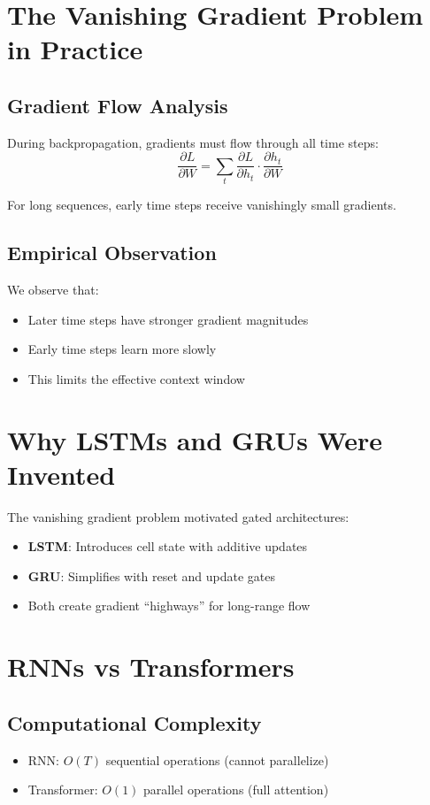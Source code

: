 \documentclass[12pt]{article}
\begin{document}
\section{The Vanishing Gradient Problem in Practice}

\subsection{Gradient Flow Analysis}
During backpropagation, gradients must flow through all time steps:
\begin{equation}
    \frac{\partial L}{\partial W} = \sum_t \frac{\partial L}{\partial h_t} \cdot \frac{\partial h_t}{\partial W}
\end{equation}

For long sequences, early time steps receive vanishingly small gradients.

\subsection{Empirical Observation}
We observe that:
\begin{itemize}
    \item Later time steps have stronger gradient magnitudes
    \item Early time steps learn more slowly
    \item This limits the effective context window
\end{itemize}

\section{Why LSTMs and GRUs Were Invented}
The vanishing gradient problem motivated gated architectures:
\begin{itemize}
    \item \textbf{LSTM}: Introduces cell state with additive updates
    \item \textbf{GRU}: Simplifies with reset and update gates
    \item Both create gradient ``highways'' for long-range flow
\end{itemize}

\section{RNNs vs Transformers}

\subsection{Computational Complexity}
\begin{itemize}
    \item RNN: $O(T)$ sequential operations (cannot parallelize)
    \item Transformer: $O(1)$ parallel operations (full attention)
\end{itemize}
\end{document}
